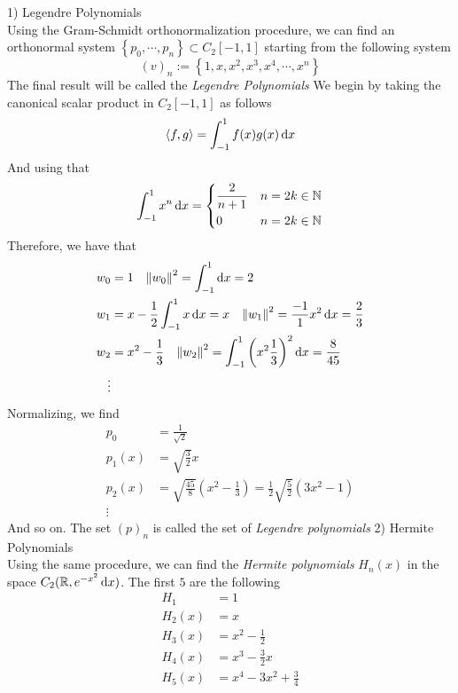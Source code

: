 \documentclass[../complete.tex]{subfiles}
\begin{document}
\begin{eg}
	1) Legendre Polynomials\\
	Using the Gram-Schmidt orthonormalization procedure, we can find an orthonormal system $\left\{ p_0,\cdots,p_n \right\}\subset C_2[-1,1]$ starting from the following system
	\begin{equation*}
		(v)_n:=\left\{ 1,x,x^2,x^3,x^4,\cdots,x^n \right\}
	\end{equation*}
	The final result will be called the \textit{Legendre Polynomials}
	We begin by taking the canonical scalar product in $C_2[-1,1]$ as follows
	\begin{equation*}
		\langle f, g \rangle=\int_{-1}^{1}f(x)g(x)\operatorname{d\!} x
	\end{equation*}
	And using that
	\begin{equation*}
		\int_{-1}^{1}x^n\operatorname{d\!} x=\begin{dcases}\frac{2}{n+1}&n=2k\in\mathbb{N}\\0&n=2k\in\mathbb{N}\end{dcases}
	\end{equation*}
	Therefore, we have that
	\begin{equation*}
		\begin{aligned}
			w_0&=1\quad\norm{w_0}^2=\int_{-1}^{1}\operatorname{d\!} x=2\\
			w_1&=x-\frac{1}{2}\int_{-1}^{1}x\operatorname{d\!} x=x\quad\norm{w_1}^2=\frac{-1}{1}x^2\operatorname{d\!} x=\frac{2}{3}\\
			w_2&=x^2-\frac{1}{3}\quad\norm{w_2}^2=\int_{-1}^{1}\left( x^2\frac{1}{3} \right)^2\operatorname{d\!} x=\frac{8}{45}\\
			\vdots&
		\end{aligned}
	\end{equation*}
	Normalizing, we find
	\begin{equation*}
		\begin{aligned}
			p_0&=\frac{1}{\sqrt{2}}\\
			p_1(x)&=\sqrt{\frac{3}{2}}x\\
			p_2(x)&=\sqrt{\frac{45}{8}}\left( x^2-\frac{1}{3} \right)=\frac{1}{2}\sqrt{\frac{5}{2}}\left( 3x^2-1 \right)\\
			\vdots&
		\end{aligned}
	\end{equation*}
	And so on. The set $(p)_n$ is called the set of \textit{Legendre polynomials}
	2) Hermite Polynomials\\
	Using the same procedure, we can find the \textit{Hermite polynomials} $H_n(x)$ in the space $C_2(\mathbb{R},e^{-x^2}\operatorname{d\!} x)$. The first $5$ are the following
	\begin{equation*}
		\begin{aligned}
			H_1&=1\\
			H_2(x)&=x\\
			H_3(x)&=x^2-\frac{1}{2}\\
			H_4(x)&=x^3-\frac{3}{2}x\\
			H_5(x)&=x^4-3x^2+\frac{3}{4}
		\end{aligned}
	\end{equation*}
\end{eg}
\end{document}
